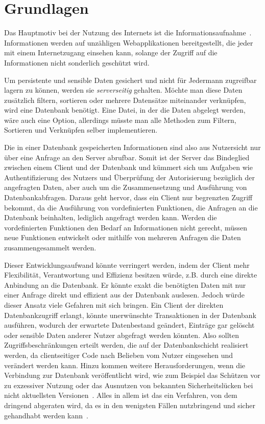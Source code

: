 
\chapter{Grundlagen}
\label{sec:basics}
Das Hauptmotiv bei der Nutzung des Internets ist die In\-for\-ma\-tions\-auf\-nah\-me~\cite{ard-zdf}.
Informationen werden auf unzähligen Webapplikationen bereitgestellt, die jeder mit einem Internetzugang einsehen kann,
solange der Zugriff auf die Informationen nicht sonderlich geschützt wird.

Um persistente und sensible Daten gesichert und nicht für Jedermann zugreifbar lagern zu können, werden sie \emph{serverseitig} gehalten.
Möchte man diese Daten zusätzlich filtern, sortieren oder mehrere Datensätze miteinander verknüpfen, wird eine Datenbank benötigt.
Eine Datei, in der die Daten abgelegt werden, wäre auch eine Option, allerdings müsste man alle Methoden zum Filtern, Sortieren und Verknüpfen
selber implementieren.

Die in einer Datenbank gespeicherten Informationen sind also aus Nutzersicht nur über eine Anfrage an den Server abrufbar.
Somit ist der Server das Bindeglied zwischen einem Client und der Datenbank und kümmert sich um Aufgaben wie Authentifizierung des Nutzers
und Überprüfung der Autorisierung bezüglich der angefragten Daten, aber auch um die Zusammensetzung und Ausführung von Datenbankabfragen.
Daraus geht hervor, dass ein Client nur begrenzten Zugriff bekommt, da die Ausführung von vordefinierten Funktionen, die Anfragen an die Datenbank beinhalten,
lediglich angefragt werden kann. Werden die vordefinierten Funktionen den Bedarf an Informationen nicht gerecht, müssen neue Funktionen entwickelt
oder mithilfe von mehreren Anfragen die Daten zusammengesammelt werden.

Dieser Entwicklungsaufwand könnte verringert werden, indem der Client mehr Flexibilität, Verantwortung und Effizienz besitzen würde,
z.B. durch eine direkte Anbindung an die Datenbank.
Er könnte exakt die benötigten Daten mit nur einer Anfrage direkt und effizient aus der Datenbank auslesen.
Jedoch würde dieser Ansatz viele Gefahren mit sich bringen. Ein Client der direkten Datenbankzugriff erlangt,
könnte unerwünschte Transaktionen in der Datenbank ausführen, wodurch der erwartete Datenbestand geändert,
Einträge gar gelöscht oder sensible Daten anderer Nutzer abgefragt werden könnten. Also sollten Zugriffsbeschränkungen erteilt werden, die
auf der Datenbankschicht realisiert werden, da clientseitiger Code nach Belieben vom Nutzer eingesehen und verändert werden kann.
Hinzu kommen weitere Herausforderungen, wenn die Verbindung zur Datenbank veröffentlicht wird,
wie zum Beispiel das Schützen vor zu exzessiver Nutzung oder das Ausnutzen von bekannten Sicherheitslücken bei nicht aktuellsten Versionen~\cite{postgresql-security}.
Alles in allem ist das ein Verfahren, von dem dringend abgeraten wird, da es in den wenigsten Fällen nutzbringend und sicher gehandhabt werden kann~\cite{client-to-database}.

